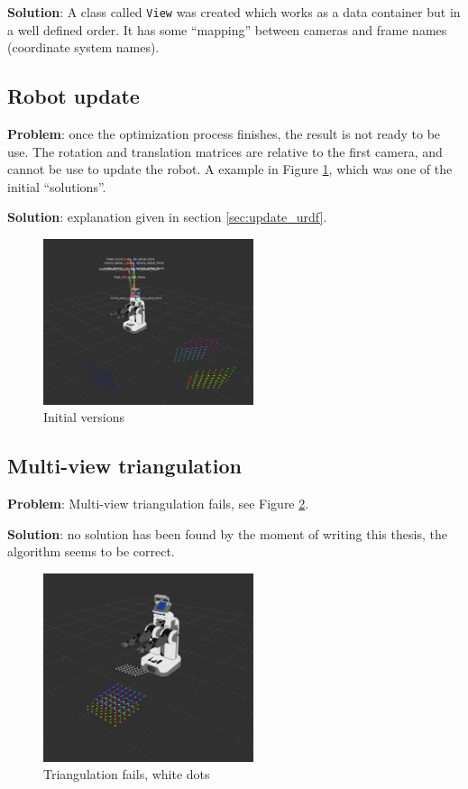 \noindent
\textbf{Solution}: A class called \texttt{View} was created which works as a data container but in a well defined order. It has some ``mapping'' between cameras and frame names (coordinate system names).


\subsection{Robot update}

\textbf{Problem}: once the optimization process finishes, the result is not ready to be use. The rotation and translation matrices are relative to the first camera, and cannot be use to update the robot. A example in Figure \ref{fig:optimization_failer}, which was one of the initial ``solutions''.

\noindent
\textbf{Solution}: explanation given in section \ref{sec:update_urdf}.

\begin{figure}[!htbp]
 \centering
 \includegraphics[width=0.55\textwidth]{images/screenshots/optimization_failer02_2.png}
 \caption{Initial versions}
 \label{fig:optimization_failer}
\end{figure}


\subsection{Multi-view triangulation}

\textbf{Problem}: Multi-view triangulation fails, see Figure \ref{fig:triangulation_fails}.

\noindent
\textbf{Solution}: no solution has been found by the moment of writing this thesis, the algorithm seems to be correct.

\begin{figure}[!htbp]
 \centering
 \includegraphics[width=0.55\textwidth]{images/screenshots/triangulation_fails.png}
 \caption{Triangulation fails, white dots}
 \label{fig:triangulation_fails}
\end{figure}

